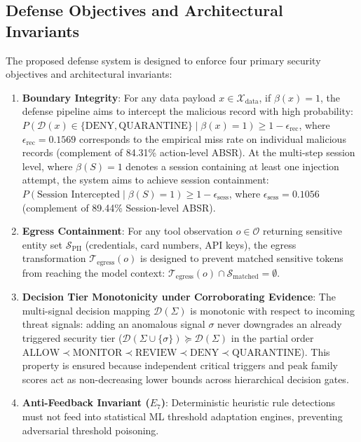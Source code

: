 \documentclass[runningheads]{llncs}
\begin{document}
\subsection{Defense Objectives and Architectural Invariants}
The proposed defense system is designed to enforce four primary security objectives and architectural invariants:
\begin{enumerate}[label=\textbf{O\arabic*:}, leftmargin=*]
    \item \textbf{Boundary Integrity}: For any data payload $x \in \mathcal{X}_{\text{data}}$, if $\beta(x) = 1$, the defense pipeline aims to intercept the malicious record with high probability: $P(\mathcal{D}(x) \in \{\text{DENY}, \text{QUARANTINE}\} \mid \beta(x) = 1) \ge 1 - \epsilon_{\text{rec}}$, where $\epsilon_{\text{rec}} = 0.1569$ corresponds to the empirical miss rate on individual malicious records (complement of 84.31\% action-level ABSR). At the multi-step session level, where $\beta(S) = 1$ denotes a session containing at least one injection attempt, the system aims to achieve session containment: $P(\text{Session Intercepted} \mid \beta(S) = 1) \ge 1 - \epsilon_{\text{sess}}$, where $\epsilon_{\text{sess}} = 0.1056$ (complement of 89.44\% Session-level ABSR).
    \item \textbf{Egress Containment}: For any tool observation $o \in \mathcal{O}$ returning sensitive entity set $\mathcal{S}_{\text{PII}}$ (credentials, card numbers, API keys), the egress transformation $\mathcal{T}_{\text{egress}}(o)$ is designed to prevent matched sensitive tokens from reaching the model context: $\mathcal{T}_{\text{egress}}(o) \cap \mathcal{S}_{\text{matched}} = \emptyset$.
    \item \textbf{Decision Tier Monotonicity under Corroborating Evidence}: The multi-signal decision mapping $\mathcal{D}(\Sigma)$ is monotonic with respect to incoming threat signals: adding an anomalous signal $\sigma$ never downgrades an already triggered security tier ($\mathcal{D}(\Sigma \cup \{\sigma\}) \succeq \mathcal{D}(\Sigma)$ in the partial order $\text{ALLOW} \prec \text{MONITOR} \prec \text{REVIEW} \prec \text{DENY} \prec \text{QUARANTINE}$). This property is ensured because independent critical triggers and peak family scores act as non-decreasing lower bounds across hierarchical decision gates.
    \item \textbf{Anti-Feedback Invariant ($E_7$)}: Deterministic heuristic rule detections must not feed into statistical ML threshold adaptation engines, preventing adversarial threshold poisoning.
\end{enumerate}
\end{document}
